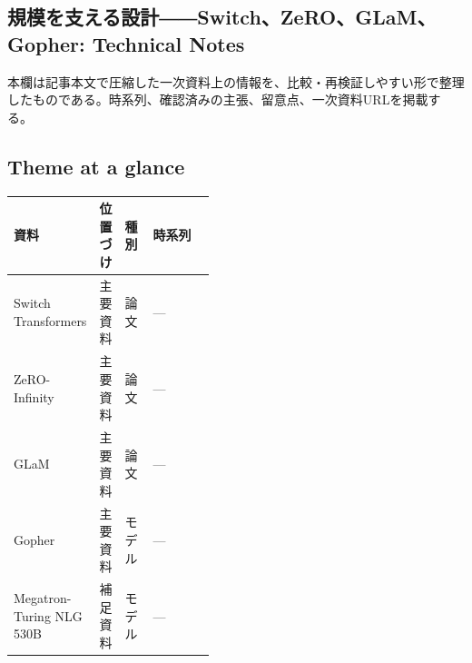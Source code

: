 \subsection*{規模を支える設計――Switch、ZeRO、GLaM、Gopher: Technical Notes}
本欄は記事本文で圧縮した一次資料上の情報を、比較・再検証しやすい形で整理したものである。時系列、確認済みの主張、留意点、一次資料URLを掲載する。
\smallskip
{}\par
\medskip
\subsection*{Theme at a glance}
\begin{center}
\footnotesize
\begin{tabularx}{\linewidth}{@{}p{0.20\linewidth}p{0.10\linewidth}p{0.14\linewidth}X@{}}
\toprule
資料 & 位置づけ & 種別 & 時系列 \\
\midrule
Switch Transformers & 主要資料 & 論文 & — \\
ZeRO-Infinity & 主要資料 & 論文 & — \\
GLaM & 主要資料 & 論文 & — \\
Gopher & 主要資料 & モデル & — \\
Megatron-Turing NLG 530B & 補足資料 & モデル & — \\
\bottomrule
\end{tabularx}
\end{center}
\normalsize

